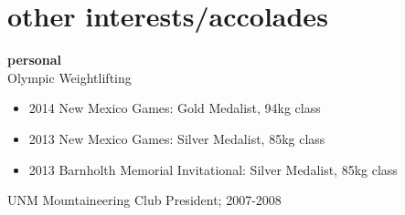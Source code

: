 \documentclass[]{friggeri-cv} %
\begin{document}
\section{other interests/accolades}


\textbf{personal} \\
Olympic Weightlifting 
\begin{itemize}
\item 2014 New Mexico Games: Gold Medalist, 94kg class
\item 2013 New Mexico Games: Silver Medalist, 85kg class
\item 2013 Barnholth Memorial Invitational: Silver Medalist, 85kg class
\end{itemize}
UNM Mountaineering Club President; 2007-2008 \\
\end{document}
